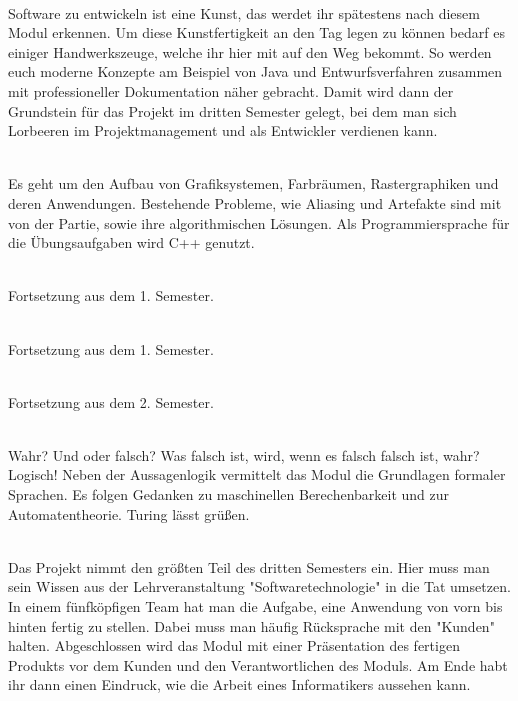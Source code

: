 \textbf{} \\
Software zu entwickeln ist eine Kunst, das werdet ihr spätestens nach diesem Modul erkennen.
Um diese Kunstfertigkeit an den Tag legen zu können bedarf es einiger Handwerkszeuge, welche ihr hier mit auf den Weg bekommt.
So werden euch moderne Konzepte am Beispiel von Java und Entwurfsverfahren zusammen mit professioneller Dokumentation näher gebracht.
Damit wird dann der Grundstein für das Projekt im dritten Semester gelegt, bei dem man sich Lorbeeren im Projektmanagement und als Entwickler verdienen kann.

\textbf{} \\
Es geht um den Aufbau von Grafiksystemen, Farbräumen, Rastergraphiken und deren Anwendungen.
Bestehende Probleme, wie Aliasing und Artefakte sind mit von der Partie, sowie ihre algorithmischen Lösungen.
Als Programmiersprache für die Übungsaufgaben wird C++ genutzt.

\textbf{} \\
Fortsetzung aus dem 1. Semester.

\textbf{} \\
Fortsetzung aus dem 1. Semester.

\hline

\textbf{} \\
Fortsetzung aus dem 2. Semester.

\textbf{} \\
Wahr?
Und oder falsch?
Was falsch ist, wird, wenn es falsch falsch ist, wahr?
Logisch!
Neben der Aussagenlogik vermittelt das Modul die Grundlagen formaler Sprachen.
Es folgen Gedanken zu maschinellen Berechenbarkeit und zur Automatentheorie.
Turing lässt grüßen.

\textbf{} \\
Das Projekt nimmt den größten Teil des dritten Semesters ein.
Hier muss man sein Wissen aus der Lehrveranstaltung "Softwaretechnologie" in die Tat umsetzen.
In einem fünfköpfigen Team hat man die Aufgabe, eine Anwendung von vorn bis hinten fertig zu stellen.
Dabei muss man häufig Rücksprache mit den "Kunden" halten.
Abgeschlossen wird das Modul mit einer Präsentation des fertigen Produkts vor dem Kunden und den Verantwortlichen des Moduls.
Am Ende habt ihr dann einen Eindruck, wie die Arbeit eines Informatikers aussehen kann.

